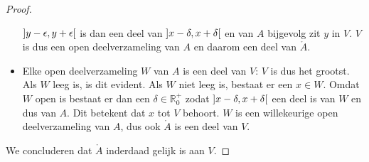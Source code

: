 \documentclass[main.tex]{subfiles}
\begin{document}
\begin{pr}
\begin{proof}
\begin{itemize}
\begin{figure}[H]
      \end{figure}
      $\interval[open]{y-\epsilon}{y+\epsilon}$ is dan een deel van $\interval[open]{x-\delta}{x+\delta}$ en van $A$ bijgevolg zit $y$ in $V$.
      $V$ is dus een open deelverzameling van $A$ en daarom een deel van $\mathring{A}$.
    \item Elke open deelverzameling $W$ van $A$ is een deel van $V$: $V$ is dus het grootst.
      Als $W$ leeg is, is dit evident.
      Als $W$ niet leeg is, bestaat er een $x\in W$.
      Omdat $W$ open is bestaat er dan een $\delta\in \mathbb{R}_{0}^{+}$ zodat $\interval[open]{x-\delta}{x+\delta}$ een deel is van $W$ en dus van $A$.
      Dit betekent dat $x$ tot $V$ behoort.
      $W$ is een willekeurige open deelverzameling van $A$, dus ook $\mathring{A}$ is een deel van $V$.
    \end{itemize}
    We concluderen dat $\mathring{A}$ inderdaad gelijk is aan $V$.
  \end{proof}
\end{pr}
\end{document}
